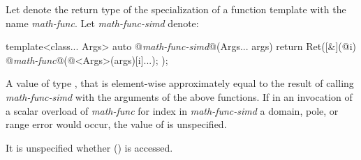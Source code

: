 \begin{itemdescr}
  \pnum
  Let  denote the return type of the specialization of a function template with the name
  \textit{math-func}.
  Let \textit{math-func-simd} denote:
  \begin{codeblock}
template<class... Args>
auto @\textit{math-func-simd}@(Args... args) {
  return Ret([&](@\simdsizetype@ i) {
      @\textit{math-func}@(@\deducedsimd@<Args>(args)[i]...);
  });
}
  \end{codeblock}

  \pnum\returns
  A value  of type , that is element-wise approximately equal to the result of
  calling \textit{math-func-simd} with the arguments of the above functions.
  If in an invocation of a scalar overload of \textit{math-func} for index  in
  \textit{math-func-simd} a domain, pole, or range error would occur, the value of  is
  unspecified.

  \pnum\remarks
  It is unspecified whether  () is accessed.
\end{itemdescr}

